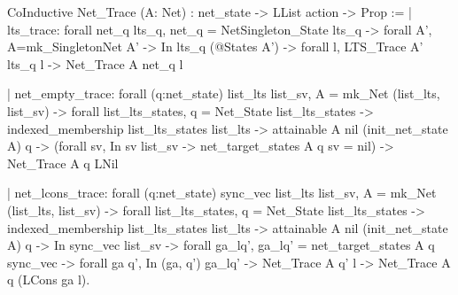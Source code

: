 CoInductive Net_Trace (A: Net) : net_state -> LList action -> Prop :=
 | lts_trace: forall net_q lts_q,
     net_q = NetSingleton_State lts_q ->
     forall A',  A=mk_SingletonNet A' ->
     In lts_q (@States A')            ->
     forall l, LTS_Trace A' lts_q l   ->
     Net_Trace A net_q l
  
 | net_empty_trace: forall (q:net_state) list_lts list_sv, 
      A = mk_Net (list_lts, list_sv)                  ->
      forall list_lts_states, q = Net_State list_lts_states        ->
      indexed_membership list_lts_states list_lts                  ->
      attainable A nil (init_net_state A) q               ->
      (forall sv, In sv list_sv -> net_target_states A q sv = nil) ->
      Net_Trace A q LNil 
      
 | net_lcons_trace: forall (q:net_state) sync_vec list_lts list_sv,
       A = mk_Net (list_lts, list_sv)                    ->
       forall list_lts_states, q = Net_State list_lts_states   ->
       indexed_membership list_lts_states list_lts             ->
       attainable A nil (init_net_state A) q                   ->
       In sync_vec list_sv                                     ->
       forall ga_lq', ga_lq' = net_target_states A q sync_vec  ->
       forall ga q', In (ga, q') ga_lq' -> Net_Trace A q' l    ->
       Net_Trace A q (LCons ga l).
